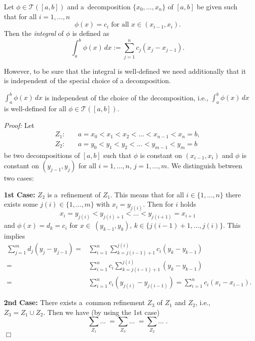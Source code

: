 

\begin{Definition}
Let $\phi\in\mathcal{T}([a,b])$ and a~decomposition $\{x_0,\ldots,x_n\}$ of $[a,b]$ be given such that for all $i=1,\ldots,n$
\[\phi(x)=c_i\text{ for all }x\in (x_{i-1},x_i) .\]
Then the \emph{integral} of $\phi$ is defined as
\[\int_a^b\phi(x) \, dx:=\sum_{j=1}^{n}c_j(x_{j}-x_{j-1}).\]
\end{Definition}


However, to be sure that the integral is well-defined we need additionally that it is independent of the special choice of a decomposition.
\begin{Lemma}{}
$\int_a^b\phi(x)\, dx$ is independent of the choice of the decomposition, i.e., $\int_a^b\phi(x)\, dx$ is well-defined for all $\phi\in\mathcal{T}([a,b])$.
\end{Lemma}


{\em Proof:}
Let
\[
\begin{aligned}
Z_1:\quad&a=x_0<x_1<x_2<\ldots<x_{n-1}<x_n=b,\\
Z_2:\quad&a=y_0<y_1<y_2<\ldots<y_{m-1}<y_m=b
\end{aligned}
\]
be two decompositions of $[a,b]$ such that $\phi$ is constant on $(x_{i-1},x_i)$ and $\phi$ is constant on $(y_{j-1},y_j)$ for all $i=1,\ldots,n$, $j=1,\ldots,m$. We distinguish between two cases:

{\bfseries 1st Case:} $Z_2$ is a~refinement of $Z_1$. This means that for all $i\in\{1,\ldots,n\}$ there exists some $j(i)\in\{1,\ldots,m\}$
with $x_i=y_{j(i)}$. Then for $i$ holds
\[x_i=y_{j(i)}<y_{j(i)+1}<\ldots<y_{j(i+1)}=x_{i+1}\]
and $\phi(x)=d_k=c_i$ for $x\in~(y_{k-1},y_k)$, $k\in\{j(i-1)+1,\ldots,j(i)\}$. This implies
\[
\begin{aligned}
\sum_{j=1}^{m}d_j(y_{j}-y_{j-1})=&\sum_{i=1}^{n}\sum_{k=j(i-1)+1}^{j(i)}c_i(y_{k}-y_{k-1})\\
=&\sum_{i=1}^{n}c_i\sum_{k=j(i-1)+1}^{j(i)}(y_{k}-y_{k-1})\\
=&\sum_{i=1}^{n}c_i(y_{j(i)}-y_{j(i-1)})=\sum_{i=1}^{n}c_i(x_i-x_{i-1}).
\end{aligned}\]

{\bfseries 2nd Case:} There exists a~common refinement $Z_3$ of $Z_1$ and $Z_2$, i.e., $Z_3=Z_1\cup Z_2$. Then we have (by using the 1st case)
\[\sum_{Z_1}...\;=\sum_{Z_3}\ldots\;=\sum_{Z_2}\ldots\;.\]
$\Box$



